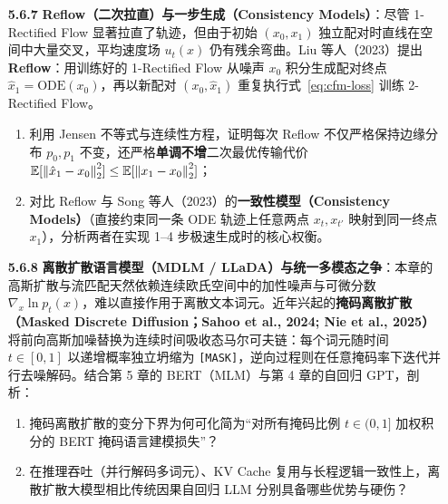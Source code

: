 \begin{enumerate}
  \item[\textbf{5.6.7}] \textbf{Reflow（二次拉直）与一步生成（Consistency Models）}：尽管 1-Rectified Flow 显著拉直了轨迹，但由于初始 $(x_0, x_1)$ 独立配对时直线在空间中大量交叉，平均速度场 $u_t(x)$ 仍有残余弯曲。Liu 等人（2023）提出 \textbf{Reflow}：用训练好的 1-Rectified Flow 从噪声 $x_0$ 积分生成配对终点 $\hat{x}_1 = \mathrm{ODE}(x_0)$，再以新配对 $(x_0, \hat{x}_1)$ 重复执行式~\eqref{eq:cfm-loss} 训练 2-Rectified Flow。
  \begin{enumerate}
    \item 利用 Jensen 不等式与连续性方程，证明每次 Reflow 不仅严格保持边缘分布 $p_0, p_1$ 不变，还严格\textbf{单调不增}二次最优传输代价 $\mathbb{E}[\left\|\hat{x}_1 - x_0\right\|_2^2] \le \mathbb{E}[\left\|x_1 - x_0\right\|_2^2]$；
    \item 对比 Reflow 与 Song 等人（2023）的\textbf{一致性模型（Consistency Models）}（直接约束同一条 ODE 轨迹上任意两点 $x_t, x_{t'}$ 映射到同一终点 $x_1$），分析两者在实现 1--4 步极速生成时的核心权衡。
  \end{enumerate}

  \item[\textbf{5.6.8}] \textbf{离散扩散语言模型（MDLM / LLaDA）与统一多模态之争}：本章的高斯扩散与流匹配天然依赖连续欧氏空间中的加性噪声与可微分数 $\nabla_x \ln p_t(x)$，难以直接作用于离散文本词元。近年兴起的\textbf{掩码离散扩散（Masked Discrete Diffusion；Sahoo et al., 2024; Nie et al., 2025）}将前向高斯加噪替换为连续时间吸收态马尔可夫链：每个词元随时间 $t \in [0, 1]$ 以递增概率独立坍缩为 \texttt{[MASK]}，逆向过程则在任意掩码率下迭代并行去噪解码。结合第 5 章的 BERT（MLM）与第 4 章的自回归 GPT，剖析：
  \begin{enumerate}
    \item 掩码离散扩散的变分下界为何可化简为“对所有掩码比例 $t \in (0, 1]$ 加权积分的 BERT 掩码语言建模损失”？
    \item 在推理吞吐（并行解码多词元）、KV Cache 复用与长程逻辑一致性上，离散扩散大模型相比传统因果自回归 LLM 分别具备哪些优势与硬伤？
  \end{enumerate}
  \exHint{BERT 只在固定 $15\%$ 掩码率下训练，无法从 $100\%$ 全掩码白板出发生成；而离散扩散在 $(0, 1]$ 全区间训练，使其能够由全 \texttt{[MASK]} 逐步并行“显影”出整篇文本！}
\end{enumerate}
